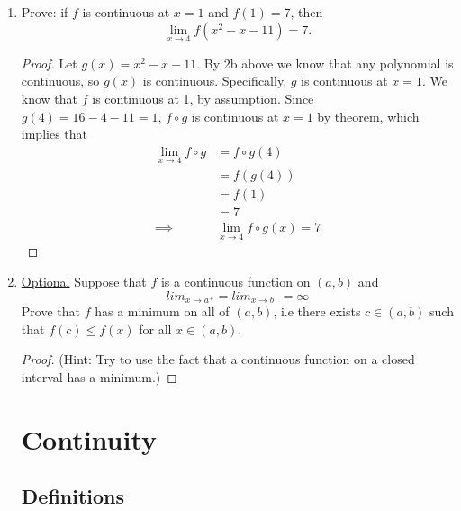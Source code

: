 \documentclass{article} %
\theoremstyle{plain}
\theoremstyle{definition}
\theoremstyle{case}
\begin{document}
\begin{enumerate}[label={\fbox{\textbf{Exercise \#\arabic* :}}}]
\newpage
\item Prove: if $f$ is continuous at $x=1$ and $f(1) = 7$,
then
$$
\lim_{x \rightarrow 4} f(x^2-x-11) = 7.
$$

\begin{proof}
  Let $g(x) = x^2 -x-11$.  By 2b above we know that any polynomial is
  continuous, so $g(x)$ is continuous.  Specifically, $g$ is continuous at
  $x=1$.  We know that $f$ is continuous at 1, by assumption.  Since\\
  $g(4) = 16 - 4 - 11 = 1$, $f \circ g$ is continuous at $x=1$ by theorem,
  which implies that
    \begin{align*}
      \lim_{x \to 4} f \circ g &= f \circ g(4) \\
                        &= f(g(4))\\
                        &= f(1)\\
                        &= 7\\
                        \implies& \lim_{x \to 4} f \circ g(x) = 7
    \end{align*}
\end{proof}

\newpage

\item \underline{Optional} Suppose that $f$ is a continuous function on $(a,b)$ and 
  \[lim _{x\rightarrow a^{+}}= lim_{x\rightarrow b^{-}}=\infty \]
  Prove that $f$ has a minimum on all of $(a,b)$, i.e there exists
 $c \in (a,b)$ such that $f(c) \leq f(x)$ for all $x\in (a,b)$.

\begin{proof} (Hint: Try to use the fact that a continuous function on a
  closed interval has a minimum.)

\end{proof}

\newpage


\section*{Continuity}%

\subsection*{Definitions}


\end{enumerate}
\end{document}
